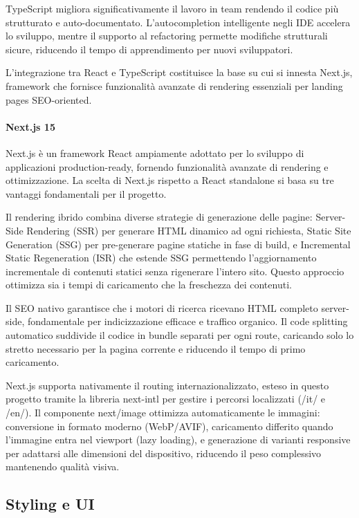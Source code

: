 TypeScript migliora significativamente il lavoro in team rendendo il codice più 
strutturato e auto-documentato. L'autocompletion intelligente negli IDE accelera 
lo sviluppo, mentre il supporto al refactoring permette modifiche strutturali 
sicure, riducendo il tempo di apprendimento per nuovi sviluppatori.

\medskip
L'integrazione tra React e TypeScript costituisce la base su cui si innesta 
Next.js, framework che fornisce funzionalità avanzate di rendering essenziali 
per landing pages SEO-oriented.

\paragraph{Next.js 15}
Next.js è un framework React ampiamente adottato per lo sviluppo di applicazioni 
production-ready, fornendo funzionalità avanzate di rendering e ottimizzazione. 
La scelta di Next.js rispetto a React standalone si basa su tre vantaggi 
fondamentali per il progetto.

Il rendering ibrido combina diverse strategie di generazione delle pagine: 
Server-Side Rendering (SSR) per generare HTML dinamico ad ogni richiesta, 
Static Site Generation (SSG) per pre-generare pagine statiche in fase di build, 
e Incremental Static Regeneration (ISR) che estende SSG permettendo 
l'aggiornamento incrementale di contenuti statici senza rigenerare l'intero 
sito. Questo approccio ottimizza sia i tempi di caricamento che la freschezza 
dei contenuti.

Il SEO nativo garantisce che i motori di ricerca ricevano HTML completo 
server-side, fondamentale per indicizzazione efficace e traffico organico. 
Il code splitting automatico suddivide il codice in bundle separati per 
ogni route, caricando solo lo stretto necessario per la pagina corrente 
e riducendo il tempo di primo caricamento.

Next.js supporta nativamente il routing internazionalizzato, esteso in questo 
progetto tramite la libreria next-intl per gestire i percorsi localizzati 
(/it/ e /en/). Il componente next/image ottimizza automaticamente le immagini: 
conversione in formato moderno (WebP/AVIF), caricamento differito quando 
l'immagine entra nel viewport (lazy loading), e generazione di varianti 
responsive per adattarsi alle dimensioni del dispositivo, riducendo il peso 
complessivo mantenendo qualità visiva.

\subsection{Styling e UI}

